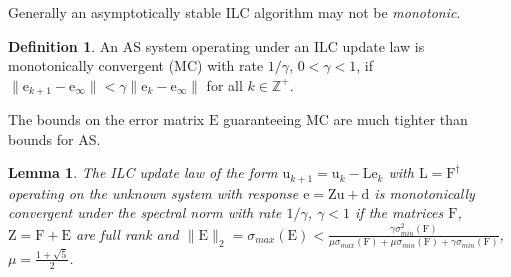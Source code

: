 \documentclass[10pt,a4paper]{article}
\theoremstyle{plain}
\newtheorem{lem}{Lemma}
\theoremstyle{definition}
\newtheorem{defn}{Definition}[section]
\newcommand{\boldvec}[1]{\boldsymbol{\mathrm{#1}}}
\let\vec\boldvec
\newcommand{\error}{\vec{e}} %
\newcommand{\linDist}{\vec{d}} %
\newcommand{\sysInput}{\vec{u}} %
\newcommand{\latentMat}{\vec{Z}} %
\newcommand{\errorMat}{\vec{E}} %
\newcommand{\lmatrix}{\vec{L}} %
\newcommand{\systemMat}{\vec{F}} %
\begin{document}
%
Generally an asymptotically stable ILC algorithm may not be \emph{monotonic}.
%
\begin{defn}
An AS system operating under an ILC update law is monotonically convergent (MC) with rate $1/\gamma$, $0 < \gamma < 1$, if $\|\error_{k+1} - \error_{\infty}\| < \gamma \|\error_{k} - \error_{\infty}\|$ for all $k \in \mathbb{Z}^{+}$.
\end{defn}
%
The bounds on the error matrix $\errorMat$ guaranteeing MC are much tighter than bounds for AS.
%
\begin{lem} The ILC update law of the form $\sysInput_{k+1} = \sysInput_{k} - \lmatrix \error_{k}$ with $\lmatrix = \systemMat^{\dagger}$ operating on the unknown system with response $\error = \latentMat \sysInput + \linDist$ is monotonically convergent under the spectral norm with rate $1/\gamma$, $\gamma < 1$ if the matrices $\systemMat$, $\latentMat = \systemMat + \errorMat$ are full rank and $\|\errorMat\|_2 = \sigma_{max}(\errorMat) < \frac{\gamma\sigma_{min}^{2}(\systemMat)}{\mu\sigma_{max}(\systemMat) + \mu\sigma_{min}(\systemMat) + \gamma\sigma_{min}(\systemMat)}$, $\mu = \frac{1 + \sqrt{5}}{2}$.  \end{lem}
%
\end{document}

